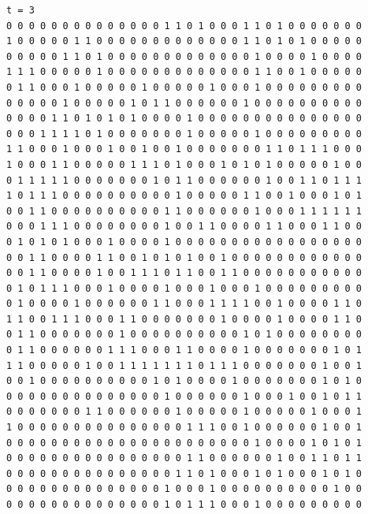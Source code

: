 \documentclass[a4paper,12pt]{article}
\begin{document}
\begin{verbatim}
t = 3
0 0 0 0 0 0 0 0 0 0 0 0 0 0 1 1 0 1 0 0 0 1 1 0 1 0 0 0 0 0 0 0 
1 0 0 0 0 0 1 1 0 0 0 0 0 0 0 0 0 0 0 0 0 1 1 0 1 0 1 0 0 0 0 0 
0 0 0 0 0 1 1 0 1 0 0 0 0 0 0 0 0 0 0 0 0 0 1 0 0 0 0 1 0 0 0 0 
1 1 1 0 0 0 0 0 1 0 0 0 0 0 0 0 0 0 0 0 0 0 1 1 0 0 1 0 0 0 0 0 
0 1 1 0 0 0 1 0 0 0 0 0 1 0 0 0 0 0 1 0 0 0 1 0 0 0 0 0 0 0 0 0 
0 0 0 0 0 1 0 0 0 0 0 1 0 1 1 0 0 0 0 0 0 1 0 0 0 0 0 0 0 0 0 0 
0 0 0 0 1 1 0 1 0 1 0 1 0 0 0 0 1 0 0 0 0 0 0 0 0 0 0 0 0 0 0 0 
0 0 0 1 1 1 1 0 1 0 0 0 0 0 0 0 1 0 0 0 0 0 1 0 0 0 0 0 0 0 0 0 
1 1 0 0 0 1 0 0 0 1 0 0 1 0 0 1 0 0 0 0 0 0 0 1 1 0 1 1 1 0 0 0 
1 0 0 0 1 1 0 0 0 0 0 1 1 1 0 1 0 0 0 1 0 1 0 1 0 0 0 0 0 1 0 0 
0 1 1 1 1 1 0 0 0 0 0 0 0 1 0 1 1 0 0 0 0 0 0 1 0 0 1 1 0 1 1 1 
1 0 1 1 1 0 0 0 0 0 0 0 0 0 0 1 0 0 0 0 0 1 1 0 0 1 0 0 0 1 0 1 
0 0 1 1 0 0 0 0 0 0 0 0 0 0 1 1 0 0 0 0 0 0 1 0 0 0 1 1 1 1 1 1 
0 0 0 1 1 1 0 0 0 0 0 0 0 0 1 0 0 1 1 0 0 0 0 1 1 0 0 0 1 1 0 0 
0 1 0 1 0 1 0 0 0 1 0 0 0 0 1 0 0 0 0 0 0 0 0 0 0 0 0 0 0 0 0 0 
0 0 1 1 0 0 0 0 1 1 0 0 1 0 1 0 1 0 0 1 0 0 0 0 0 0 0 0 0 0 0 0 
0 0 1 1 0 0 0 0 1 0 0 1 1 1 0 1 1 0 0 1 1 0 0 0 0 0 0 0 0 0 0 0 
0 1 0 1 1 1 0 0 0 1 0 0 0 0 1 0 0 0 1 0 0 0 1 0 0 0 0 0 0 0 0 0 
0 1 0 0 0 0 1 0 0 0 0 0 0 1 1 0 0 0 1 1 1 1 0 0 1 0 0 0 0 1 1 0 
1 1 0 0 1 1 1 0 0 0 1 1 0 0 0 0 0 0 0 1 0 0 0 0 1 0 0 0 0 1 1 0 
0 1 1 0 0 0 0 0 0 0 1 0 0 0 0 0 0 0 0 0 0 1 0 1 0 0 0 0 0 0 0 0 
0 1 1 0 0 0 0 0 0 1 1 1 0 0 0 1 1 0 0 0 0 1 0 0 0 0 0 0 0 1 0 1 
1 1 0 0 0 0 0 1 0 0 1 1 1 1 1 1 1 0 1 1 1 0 0 0 0 0 0 0 1 0 0 1 
0 0 1 0 0 0 0 0 0 0 0 0 0 1 0 1 0 0 0 0 1 0 0 0 0 0 0 0 1 0 1 0 
0 0 0 0 0 0 0 0 0 0 0 0 0 0 1 0 0 0 0 0 0 1 0 0 0 1 0 0 1 0 1 1 
0 0 0 0 0 0 0 1 1 0 0 0 0 0 0 1 0 0 0 0 0 1 0 0 0 0 0 1 0 0 0 1 
1 0 0 0 0 0 0 0 0 0 0 0 0 0 0 0 1 1 1 0 0 1 0 0 0 0 0 0 1 0 0 1 
0 0 0 0 0 0 0 0 0 0 0 0 0 0 0 0 0 0 0 0 0 0 1 0 0 0 0 1 0 1 0 1 
0 0 0 0 0 0 0 0 0 0 0 0 0 0 0 0 1 1 0 0 0 0 0 0 1 0 0 1 1 0 1 1 
0 0 0 0 0 0 0 0 0 0 0 0 0 0 0 1 1 0 1 0 0 0 1 0 1 0 0 0 1 0 1 0 
0 0 0 0 0 0 0 0 0 0 0 0 0 0 1 0 0 0 1 0 0 0 0 0 0 0 0 0 0 1 0 0 
0 0 0 0 0 0 0 0 0 0 0 0 0 0 1 0 1 1 1 0 0 0 1 0 0 0 0 0 0 0 0 0 




\end{verbatim}
\end{document}
